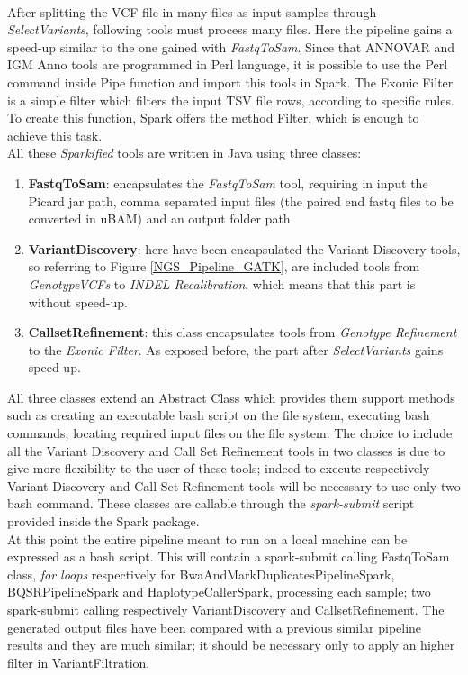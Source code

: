 \\[1\baselineskip]
After splitting the VCF file in many files as input samples through \textit{SelectVariants}, following tools must process many files. Here the pipeline gains a speed-up similar to the one gained with \textit{FastqToSam}. Since that ANNOVAR and IGM Anno tools are programmed in Perl language, it is possible to use the Perl command inside Pipe function and import this tools in Spark.\newline
The Exonic Filter is a simple filter which filters the input TSV file rows, according to specific rules. To create this function, Spark offers the method Filter, which is enough to achieve this task.
\\[1\baselineskip]
All these \textit{Sparkified} tools are written in Java using three classes:
\begin{enumerate}
  \item \textbf{FastqToSam}: encapsulates the \textit{FastqToSam} tool, requiring in input the Picard jar path, comma separated input files (the paired end fastq files to be converted in uBAM) and an output folder path. 
  \item \textbf{VariantDiscovery}: here have been encapsulated the Variant Discovery tools, so referring to Figure \ref{NGS_Pipeline_GATK}, are included tools from \textit{GenotypeVCFs} to \textit{INDEL Recalibration}, which means that this part is without speed-up.
  \item \textbf{CallsetRefinement}: this class encapsulates tools from \textit{Genotype Refinement} to the \textit{Exonic Filter}. As exposed before, the part after \textit{SelectVariants} gains speed-up.
\end{enumerate}
All three classes extend an Abstract Class which provides them support methods such as creating an executable bash script on the file system, executing bash commands, locating required input files on the file system.\newline
The choice to include all the Variant Discovery and Call Set Refinement tools in two classes is due to give more flexibility to the user of these tools; indeed to execute respectively Variant Discovery and Call Set Refinement tools will be necessary to use only two bash command. These classes are callable through the \textit{spark-submit} script provided inside the Spark package.
\\[2\baselineskip]
At this point the entire pipeline meant to run on a local machine can be expressed as a bash script. This will contain a spark-submit calling FastqToSam class, \textit{for loops} respectively for BwaAndMarkDuplicatesPipelineSpark, BQSRPipelineSpark and HaplotypeCallerSpark, processing each sample; two spark-submit calling respectively VariantDiscovery and CallsetRefinement.\newline
The generated output files have been compared with a previous similar pipeline \cite{ScalableEfficientWhole-ExomeProcessing} results and they are much similar; it should be necessary only to apply an higher filter in VariantFiltration.

